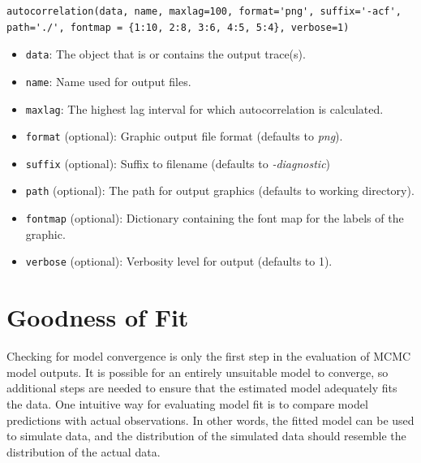 \begin{verbatim}
autocorrelation(data, name, maxlag=100, format='png', suffix='-acf',
path='./', fontmap = {1:10, 2:8, 3:6, 4:5, 5:4}, verbose=1)
\end{verbatim}
\begin{itemize}
	\item \verb=data=: The object that is or contains the output
trace(s).

	\item \verb=name=: Name used for output files.
	
	\item \verb=maxlag=: The highest lag interval for which
autocorrelation is calculated.

	\item \verb=format= (optional): Graphic output file format
(defaults to \emph{png}).

	\item \verb=suffix= (optional): Suffix to filename (defaults to
\emph{-diagnostic})

	\item \verb=path= (optional): The path for output graphics
(defaults to working directory).

	\item \verb=fontmap= (optional): Dictionary containing the font map
for the labels of the graphic.

	\item \verb=verbose= (optional): Verbosity level for output
(defaults to 1).
\end{itemize}


\hypertarget{gof}{}
\section{Goodness of Fit} %

Checking for model convergence is only the first step in the evaluation of MCMC model outputs. It is possible for an entirely unsuitable model to converge, so additional steps are needed to ensure that the estimated model adequately fits the data. One intuitive way for evaluating model fit is to compare model predictions with actual observations. In other words, the fitted model can be used to simulate data, and the distribution of the simulated data should resemble the distribution of the actual data.

